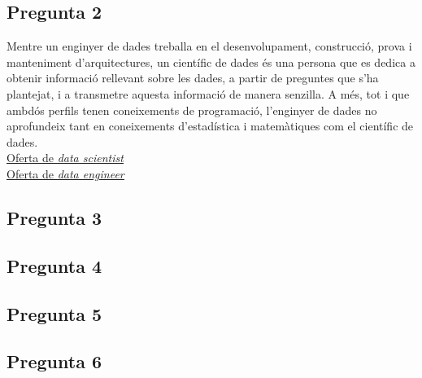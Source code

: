 \documentclass[a4paper,12pt]{report}
\begin{document}
\subsection*{Pregunta 2}
Mentre un enginyer de dades treballa en el desenvolupament, construcció, prova i manteniment d'arquitectures, un científic de dades és una persona que es dedica a obtenir informació rellevant sobre les dades, a partir de preguntes que s'ha plantejat, i a transmetre aquesta informació de manera senzilla. A més, tot i que ambdós perfils tenen coneixements de programació, l'enginyer de dades no aprofundeix tant en coneixements d'estadística i matemàtiques com el científic de dades.\\
\href{https://www.linkedin.com/jobs/search/?currentJobId=4167044480&geoId=104738515&keywords=data%20scientist&origin=JOB_SEARCH_PAGE_SEARCH_BUTTON&refresh=true}{\underline{Oferta de \textit{data scientist}}}\\
\href{https://www.linkedin.com/jobs/search/?currentJobId=4172639382&geoId=104738515&keywords=data%20engineer&origin=JOB_SEARCH_PAGE_SEARCH_BUTTON&refresh=true}{\underline{Oferta de \textit{data engineer}}}

\subsection*{Pregunta 3}

\subsection*{Pregunta 4}

\subsection*{Pregunta 5}

\subsection*{Pregunta 6}
\end{document}
